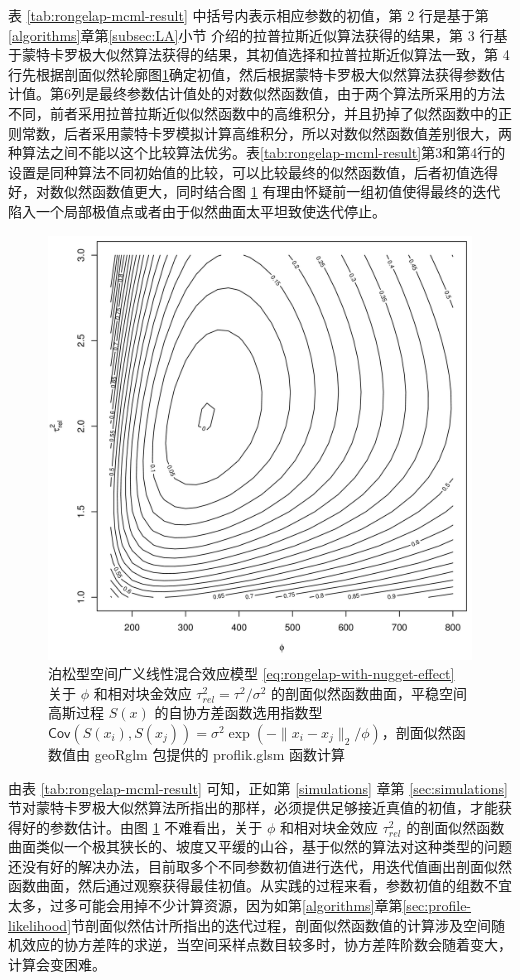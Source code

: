 \documentclass[12pt,a4paper,UTF8,twoside]{book}
\theoremstyle{definition}
\theoremstyle{definition}
\theoremstyle{definition}
\theoremstyle{remark}
\begin{document}
表 \ref{tab:rongelap-mcml-result} 中括号内表示相应参数的初值，第 2
行是基于第\ref{algorithms}章第\ref{subsec:LA}小节
介绍的拉普拉斯近似算法获得的结果，第 3
行基于蒙特卡罗极大似然算法获得的结果，其初值选择和拉普拉斯近似算法一致，第
4
行先根据剖面似然轮廓图\ref{fig:profile-phi-tausq}确定初值，然后根据蒙特卡罗极大似然算法获得参数估计值。第6列是最终参数估计值处的对数似然函数值，由于两个算法所采用的方法不同，前者采用拉普拉斯近似似然函数中的高维积分，并且扔掉了似然函数中的正则常数，后者采用蒙特卡罗模拟计算高维积分，所以对数似然函数值差别很大，两种算法之间不能以这个比较算法优劣。表\ref{tab:rongelap-mcml-result}第3和第4行的设置是同种算法不同初始值的比较，可以比较最终的似然函数值，后者初值选得好，对数似然函数值更大，同时结合图
\ref{fig:profile-phi-tausq}
有理由怀疑前一组初值使得最终的迭代陷入一个局部极值点或者由于似然曲面太平坦致使迭代停止。

\begin{figure}[!htb]

{\centering \includegraphics[width=0.65\linewidth]{figures/profile-phitausq} 

}

\caption{泊松型空间广义线性混合效应模型
\eqref{eq:rongelap-with-nugget-effect} 关于 \(\phi\) 和相对块金效应
\(\tau^2_{rel} = \tau^2 / \sigma^2\)
的剖面似然函数曲面，平稳空间高斯过程 \(S(x)\) 的自协方差函数选用指数型
\(\mathsf{Cov}( S(x_i), S(x_j) ) = \sigma^2 \exp( -\|x_i -x_j\|_{2} / \phi )\)，剖面似然函数值由
geoRglm 包提供的 proflik.glsm 函数计算}\label{fig:profile-phi-tausq}
\end{figure}

由表 \ref{tab:rongelap-mcml-result} 可知，正如第 \ref{simulations} 章第
\ref{sec:simulations}
节对蒙特卡罗极大似然算法所指出的那样，必须提供足够接近真值的初值，才能获得好的参数估计。由图
\ref{fig:profile-phi-tausq} 不难看出，关于 \(\phi\) 和相对块金效应
\(\tau^2_{rel}\)
的剖面似然函数曲面类似一个极其狭长的、坡度又平缓的山谷，基于似然的算法对这种类型的问题还没有好的解决办法，目前取多个不同参数初值进行迭代，用迭代值画出剖面似然函数曲面，然后通过观察获得最佳初值。从实践的过程来看，参数初值的组数不宜太多，过多可能会用掉不少计算资源，因为如第\ref{algorithms}章第\ref{sec:profile-likelihood}节剖面似然估计所指出的迭代过程，剖面似然函数值的计算涉及空间随机效应的协方差阵的求逆，当空间采样点数目较多时，协方差阵阶数会随着变大，计算会变困难。
\end{document}
